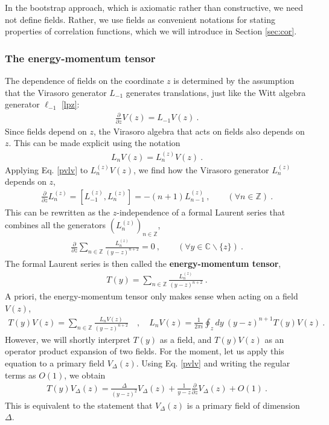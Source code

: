 \documentclass[12pt, a4paper]{article}
\theoremstyle{break}
\begin{document}
In the bootstrap approach, which is axiomatic rather than constructive, we need not define fields. Rather, we use fields as convenient notations for stating properties of correlation functions, which we will introduce in Section \ref{sec:cor}. 

\subsubsection{The energy-momentum tensor}

The dependence of fields on the coordinate $z$ is determined by the assumption that the Virasoro generator $L_{-1}$ generates translations, just like the Witt algebra generator $\ell_{-1}$ \eqref{lpz}:
\begin{align}
  \boxed{\frac{\partial}{\partial z} V(z) = L_{-1} V(z)}  \ .
  \label{pvlv}
 \end{align}
 Since fields depend on $z$, the Virasoro algebra that acts on fields also depends on $z$. This can be made explicit using the notation
\begin{align}
   L_n V(z) = L_n^{(z)} V(z) \ . 
\end{align}
Applying Eq. \eqref{pvlv} to $L_n^{(z)} V(z)$, we find how the Virasoro generator $L_n^{(z)}$ depends on $z$,
 \begin{align}
 \frac{\partial}{\partial z} L_n^{(z)} = [L_{-1}^{(z)},L_n^{(z)}]= -(n+1)L_{n-1}^{(z)}\ ,\qquad (\forall n\in\mathbb{Z})\ .
\end{align}
This can be rewritten as the $z$-independence of a formal Laurent series that combines all the generators $(L_n^{(z)})_{n\in\mathbb{Z}}$, 
\begin{align}
 \frac{\partial}{\partial z} \sum_{n\in\mathbb{Z}} \frac{L_n^{(z)}}{(y-z)^{n+2}} = 0\ ,\qquad (\forall y\in\mathbb{C}\backslash \{z\})\ .
\end{align}
The formal Laurent series is then called the \textbf{energy-momentum tensor}, 
\begin{align}
  \boxed{T(y) = \sum_{n\in\mathbb{Z}} \frac{L_n^{(z)}}{(y-z)^{n+2}}} \ .
  \label{tl}
 \end{align}
 A priori, the energy-momentum tensor only makes sense when acting on a field $V(z)$,
 \begin{align}
 T(y)V(z) = \sum_{n\in\mathbb{Z}} \frac{L_n V(z)}{(y-z)^{n+2}}\quad , \quad L_n V(z) = \frac{1}{2\pi i} \oint_{z}dy\ (y-z)^{n+1} T(y)V(z)\ .
 \label{lvtv}
\end{align}
However, we will shortly interpret $T(y)$ as a field, and $T(y)V(z)$ as an operator product expansion of two fields. For the moment, let us apply this equation to a primary field $V_\Delta(z)$. Using Eq. \eqref{pvlv} and writing the regular terms as $O(1)$, we obtain
\begin{align}
 \boxed{T(y)V_\Delta(z) = \frac{\Delta}{(y-z)^2} V_\Delta(z) + \frac{1}{y-z} \frac{\partial}{\partial z} V_\Delta(z) + O(1)}\ .
 \label{tvd}
\end{align}
This is equivalent to the statement that $V_\Delta(z)$ is a primary field of dimension $\Delta$.
\end{document}
